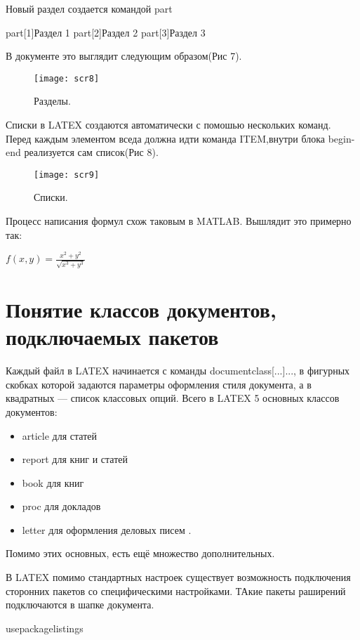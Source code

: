 \documentclass{article}
\begin{document}
Новый раздел создается командой part
\begin{verbatim*}
	part[1]{Раздел 1}
	part[2]{Раздел 2}
	part[3]{Раздел 3}
\end{verbatim*}
В документе это выглядит следующим образом(Рис 7).
\begin{figure}
	\center
	\texttt{[image: scr8]}
	\caption{Разделы.}
\end{figure}
Списки в LATEX создаются автоматически с помошью нескольких команд. Перед каждым элементом вседа должна идти команда ITEM,внутри блока begin-end реализуется сам список(Рис 8).
\begin{figure}
	\center
	\texttt{[image: scr9]}
	\caption{Списки.}
\end{figure}
Процесс написания формул схож  таковым в MATLAB. Вышлядит это примерно так:
\begin{verbatim*}
	f\{x,y}\=\frac{x^2+y^2}{\sqrt{x^3+y^3}}
\end{verbatim*}
\begin{math}
	f(x,y) = \frac{x^2+y^2}{\sqrt{x^3+y^3}}
\end{math}

\section[5]{Понятие классов документов, подключаемых пакетов}

Каждый файл в LATEX начинается с команды documentclass[...]{...}, в фигурных скобках которой задаются параметры оформления стиля документа, а в квадратных — список классовых опций.
Всего в LATEX 5 основных классов документов:
\begin{itemize}
\item {article для статей}
\item {report для книг и статей}
\item {book для книг}
\item {proc для докладов}
\item {letter для оформления деловых писем} . 
\end{itemize} 
Помимо этих основных, есть ещё множество дополнительных.


В LATEX помимо стандартных настроек существует возможность подключения сторонних пакетов со специфическими настройками. ТАкие пакеты раширений подключаются в шапке документа.
\begin{verbatim*}
	usepackage{listings} % предоставляет возможности цитирования кода в тексте с сохранением исходного форматирования.
\end{verbatim*}
\end{document}
